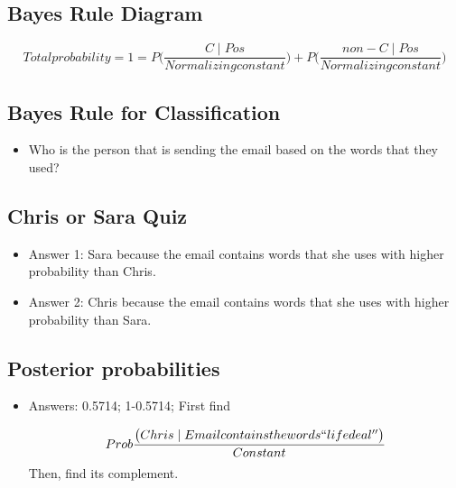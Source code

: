 \documentclass[12pt]{report}
\begin{document}
\subsection{Bayes Rule Diagram}

\begin{equation}
Total probability = 1 = P \big( \frac{C \mid Pos}{Normalizing constant} \big) + P\big( \frac{non-C \mid Pos}{Normalizing constant} \big)
\end{equation}


\subsection{Bayes Rule for Classification}

\begin{itemize}

\item Who is the person that is sending the email based on the words that they used? 

\end{itemize}

\subsection{Chris or Sara Quiz}

\begin{itemize}

\item Answer 1: Sara because the email contains words that she uses with higher probability than Chris. 

\item Answer 2: Chris because the email contains words that she uses with higher probability than Sara. 

\end{itemize}

\subsection{Posterior probabilities}

\begin{itemize}

\item Answers: 0.5714; 1-0.5714; First find 

\begin{equation}
Prob \frac{\big(Chris \mid Email contains the words ``life deal'' \big)}{Constant}
\end{equation}
Then, find its complement. 

\end{itemize}
\end{document}
